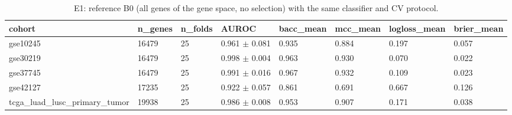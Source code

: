 \begin{table}[t]
  \centering
  \caption{E1: reference B0 (all genes of the gene space, no selection) with the same classifier and CV protocol.}
  \label{tab:e1_b0}
  \small
  \begin{tabular}{llllllll}
    \toprule
    cohort & n\_genes & n\_folds & AUROC & bacc\_mean & mcc\_mean & logloss\_mean & brier\_mean \\
    \midrule
    gse10245 & 16479 & 25 & 0.961 $\pm$ 0.081 & 0.935 & 0.884 & 0.197 & 0.057 \\
    gse30219 & 16479 & 25 & 0.998 $\pm$ 0.004 & 0.963 & 0.930 & 0.070 & 0.022 \\
    gse37745 & 16479 & 25 & 0.991 $\pm$ 0.016 & 0.967 & 0.932 & 0.109 & 0.023 \\
    gse42127 & 17235 & 25 & 0.922 $\pm$ 0.057 & 0.861 & 0.691 & 0.667 & 0.126 \\
    tcga\_luad\_lusc\_primary\_tumor & 19938 & 25 & 0.986 $\pm$ 0.008 & 0.953 & 0.907 & 0.171 & 0.038 \\
    \bottomrule
  \end{tabular}
\end{table}

